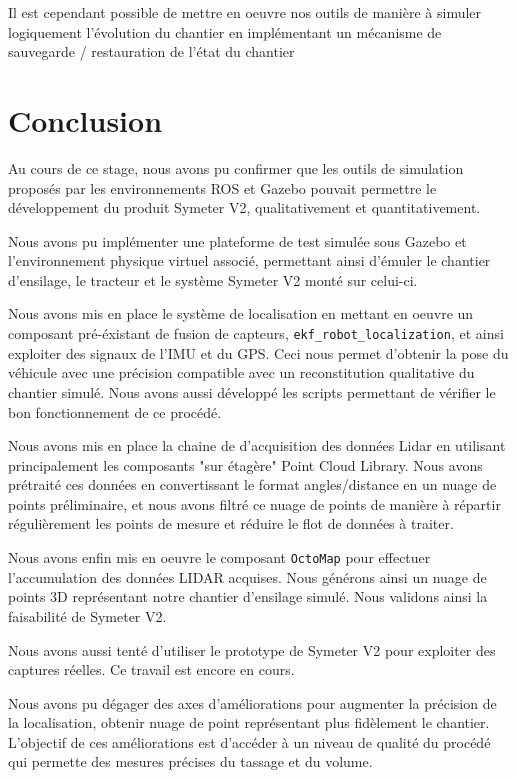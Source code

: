\documentclass[12pt,a4paper]{report}
\begin{document}
\para Il est cependant possible de mettre en oeuvre nos outils de manière à simuler logiquement l'évolution du chantier en implémentant un mécanisme de sauvegarde / restauration de l'état du chantier



\chapter{Conclusion}

Au cours de ce stage, nous avons pu confirmer que les outils de simulation proposés par les environnements  ROS et Gazebo pouvait permettre le développement du produit Symeter V2, qualitativement et quantitativement.

\para Nous avons pu implémenter une plateforme de test simulée sous Gazebo et l'environnement physique virtuel associé, permettant ainsi d'émuler le chantier d'ensilage, le tracteur et le système Symeter V2 monté sur celui-ci.

\para Nous avons mis en place le système de localisation en mettant en oeuvre un composant pré-éxistant de fusion de capteurs, \verb|ekf_robot_localization|, et ainsi exploiter des signaux de l'IMU et du GPS. Ceci nous permet d'obtenir la pose du véhicule avec une précision compatible avec un reconstitution qualitative du chantier simulé. Nous avons aussi développé les scripts permettant de vérifier le bon fonctionnement de ce procédé.

\para Nous avons mis en place la chaine de d'acquisition des données Lidar en utilisant principalement les composants "sur étagère" Point Cloud Library. Nous avons prétraité ces données en convertissant le format angles/distance en un nuage de points préliminaire, et nous avons filtré ce nuage de points de manière à répartir régulièrement les points de mesure et réduire le flot de données à traiter.

\para Nous avons enfin mis en oeuvre le composant \verb|OctoMap| pour effectuer l'accumulation des données LIDAR acquises. Nous générons ainsi un nuage de points 3D représentant notre chantier d'ensilage simulé. Nous validons ainsi la faisabilité de Symeter V2.

\para Nous avons aussi tenté d'utiliser le prototype de Symeter V2 pour exploiter des captures réelles. Ce travail est encore en cours.

\para Nous avons pu dégager des axes d'améliorations pour augmenter la précision de la localisation, obtenir nuage de point représentant plus fidèlement le chantier. L'objectif de ces améliorations est d'accéder à un niveau de qualité du procédé qui permette des mesures précises du tassage et du volume.
\end{document}
